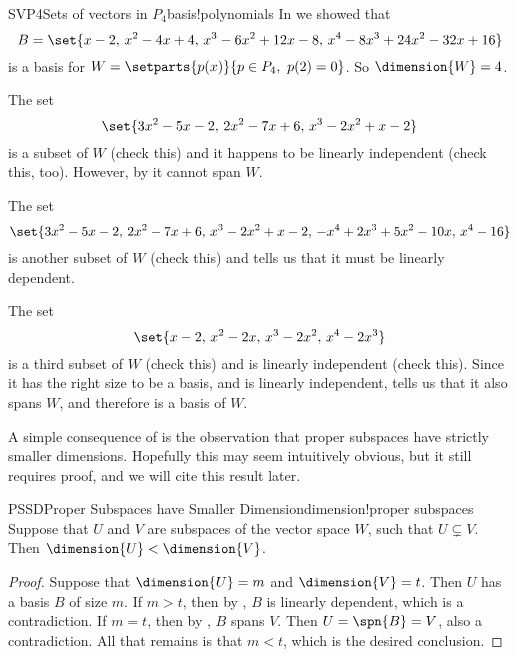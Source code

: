 \begin{example}{SVP4}{Sets of vectors in $P_4$}{basis!polynomials}
In  we showed that
%
\begin{equation*}
B=\set{x-2,\,x^2-4x+4,\,x^3-6x^2+12x-8,\,x^4-8x^3+24x^2-32x+16}
\end{equation*}
%
is a basis for $W=\setparts{p(x)}{p\in P_4,\ p(2)=0}$.  So $\dimension{W}=4$.\par
%
The set
%
\begin{equation*}
\set{3x^2-5x-2,\,2x^2-7x+6,\,x^3-2x^2+x-2}
\end{equation*}
%
is a subset of $W$ (check this) and it happens to be linearly independent (check this, too).  However, by  it cannot span $W$.\par
%
The set
%
\begin{equation*}
\set{3x^2-5x-2,\,2x^2-7x+6,\,x^3-2x^2+x-2,\,-x^4+2x^3+5x^2-10x,\,x^4-16}
\end{equation*}
%
is another subset of $W$ (check this) and  tells us that it must be linearly dependent.\par
%
The set
%
\begin{equation*}
\set{x-2,\,x^2-2x,\,x^3-2x^2,\,x^4-2x^3}
\end{equation*}
%
is a third subset of $W$ (check this) and is linearly independent (check this).  Since it has the right size to be a basis, and is linearly independent,  tells us that it also spans $W$, and therefore is a basis of $W$.\par
%
\end{example}
%
A simple consequence of  is the observation that proper subspaces have strictly smaller dimensions.  Hopefully this may seem intuitively obvious, but it still requires proof, and we will cite this result later.
%
\begin{theorem}{PSSD}{Proper Subspaces have Smaller Dimension}{dimension!proper subspaces}
Suppose that $U$ and $V$ are subspaces of the vector space $W$, such that $U\subsetneq V$.  Then $\dimension{U}<\dimension{V}$.
\end{theorem}
%
\begin{proof}
Suppose that $\dimension{U}=m$ and $\dimension{V}=t$.  Then $U$ has a basis $B$ of size $m$.  If $m>t$, then by , $B$ is linearly dependent, which is a contradiction.  If $m=t$, then by , $B$ spans $V$.  Then $U=\spn{B}=V$, also a contradiction.  All that remains is that $m<t$, which is the desired conclusion.
\end{proof}
